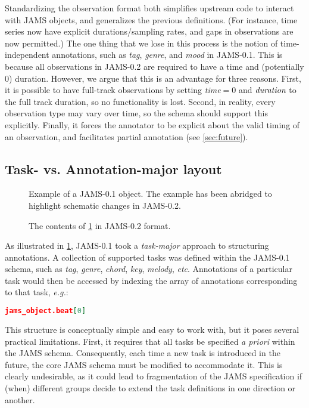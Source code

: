 \documentclass{article}
\begin{document}
Standardizing the observation format both simplifies upstream code to interact with JAMS objects, and generalizes the previous
definitions. (For instance, time series now have explicit durations/sampling rates, and gaps in observations are now permitted.)
The one thing that we lose in this process is the notion of time-independent annotations, such as \emph{tag}, \emph{genre}, and \emph{mood} 
in JAMS-0.1.
This is because all observations in JAMS-0.2 are required to have a time and (potentially 0) duration.
However, we argue that this is an advantage for three reasons.
First, it is possible to have full-track observations by setting \emph{time}$=0$ and $\emph{duration}$ to the full track duration, so no functionality is lost.
Second, in reality, every observation type may vary over time, so the schema should support this explicitly.
Finally, it forces the annotator to be explicit about the valid timing of an observation, and facilitates partial annotation (see \cref{sec:future}).

\subsection{Task- vs. Annotation-major layout}\label{sec:schema:task}

\begin{figure}
    \tiny
    
    \caption{Example of a JAMS-0.1 object.  The example has been abridged to highlight
        schematic changes in JAMS-0.2.\label{jams1}}
\end{figure}

\begin{figure}
    \tiny
    
    \caption{The contents of \cref{jams1} in JAMS-0.2 format.\label{jams2}}
\end{figure}

As illustrated in \cref{jams1}, JAMS-0.1 took a \emph{task-major} approach to structuring annotations.  A collection of supported tasks was
defined within the JAMS-0.1 schema, such as \emph{tag}, \emph{genre}, \emph{chord}, \emph{key}, \emph{melody}, \emph{etc}.  Annotations of a
particular task would then be accessed by indexing the array of annotations corresponding to that task, \emph{e.g.}:
\begin{lstlisting}[language=json]
  jams_object.beat[0]
\end{lstlisting}

This structure is conceptually simple and easy to work with, but it poses several practical limitations.
First, it requires that all tasks be specified \emph{a priori} within the JAMS schema.
Consequently, each time a new task is introduced in the future, the core JAMS schema must be modified to accommodate it.
This is clearly undesirable, as it could lead to fragmentation of the JAMS specification if (when) different groups decide to extend the task definitions in one direction or another.
\end{document}
